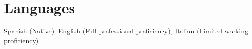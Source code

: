 
\section{Languages}

Spanish (Native), English (Full professional proficiency), Italian (Limited working proficiency)%